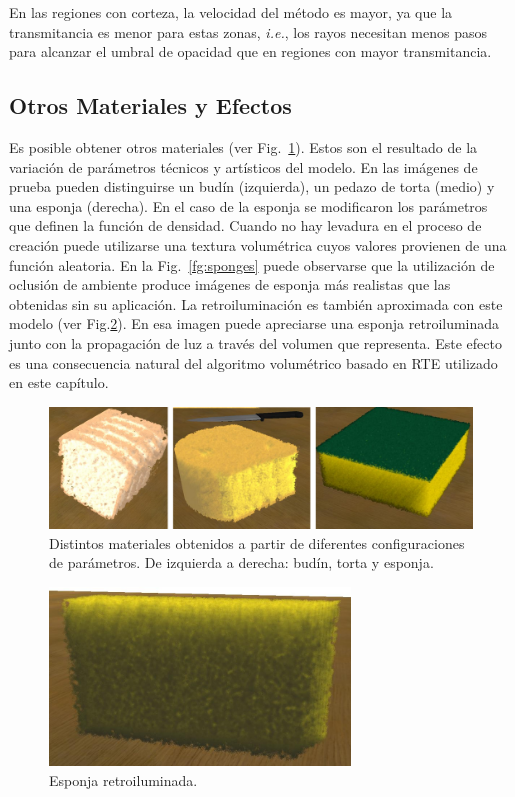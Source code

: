 En las regiones con corteza, la velocidad del método es mayor, ya que la transmitancia es menor para estas zonas, {\em i.e.}, los rayos necesitan menos pasos para alcanzar el umbral de opacidad que en regiones con mayor transmitancia.

\subsection{Otros Materiales y Efectos}
Es posible obtener otros materiales (ver Fig.~\ref{fg:fig6}).
Estos son el resultado de la variación de parámetros técnicos y artísticos del modelo.
En las imágenes de prueba pueden distinguirse un budín (izquierda), un pedazo de torta (medio) y una esponja (derecha).
En el caso de la esponja se modificaron los parámetros que definen la función de densidad.
Cuando no hay levadura en el proceso de creación puede utilizarse una textura volumétrica cuyos valores provienen de una función aleatoria.
En la Fig.~\ref{fg:sponges} puede observarse que la utilización de oclusión de ambiente produce imágenes de esponja más realistas que las obtenidas sin su aplicación.
La retroiluminación es también aproximada con este modelo (ver Fig.\ref{fg:fig7}).
En esa imagen puede apreciarse una esponja retroiluminada junto con la propagación de luz a través del volumen que representa.
Este efecto es una consecuencia natural del algoritmo volumétrico basado en RTE utilizado en este capítulo.

\begin{figure}[htb!]
  \centerline{\includegraphics[width=13cm]{fig6}}
  \caption{Distintos materiales obtenidos a partir de diferentes configuraciones de parámetros. De izquierda a derecha: budín, torta y esponja. }
  \label{fg:fig6}

\end{figure}

\begin{figure}[htb!]
  \centerline{\includegraphics[width=8cm]{fig7}}
  \caption{Esponja retroiluminada.}
  \label{fg:fig7}
\end{figure}


